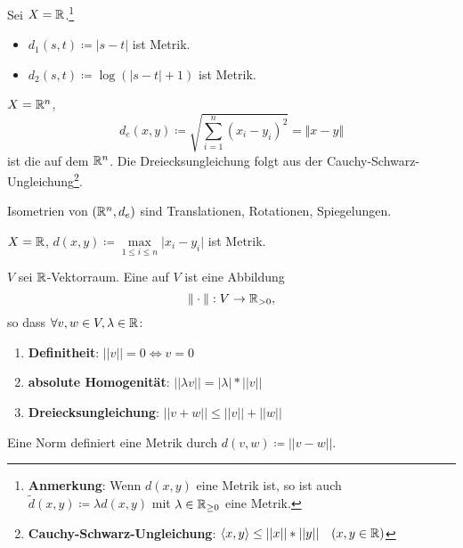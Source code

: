 \begin{example}\label{bsp:simpleMetriken}
  Sei \( X = \mathbb{R} \).\footnote{\textbf{Anmerkung}: Wenn \( d(x, y) \) eine Metrik ist, so ist auch \( \widetilde{d}(x, y) \coloneqq \lambda d(x, y) \) mit \( \lambda \in \mathbb{R}_{\geq 0} \) eine Metrik.}
  \begin{itemize}
    \item \( d_1(s, t) \coloneqq |s-t| \) ist Metrik.
    \item \( d_2(s, t) \coloneqq \log(|s-t|+1) \) ist Metrik.
  \end{itemize}
\end{example}

\begin{example}\label{bsp:standardmetrik}
  \( X = \mathbb{R}^n \),
  \begin{equation*}
    d_e(x, y) \coloneqq \sqrt{\sum_{i=1}^n{(x_i-y_i)}^2} = \Vert x-y \Vert
  \end{equation*}
  ist die  auf dem \( \mathbb{R}^n \). Die Dreiecksungleichung folgt aus der Cauchy-Schwarz-Ungleichung\footnote{\textbf{Cauchy-Schwarz-Ungleichung}: \( \langle x, y \rangle \leq ||x||*||y|| \quad (x, y \in \mathbb{R}) \)}.
\end{example}

\begin{remark}[aus LA II]
  Isometrien von \( (\mathbb{R}^n, d_e) \) sind Translationen, Rotationen, Spiegelungen.
\end{remark}

\begin{example}[Maximumsmetrik]\label{bsp:maximumsmetrik}
  \( X = \mathbb{R} \), \( d(x, y) \coloneqq \underset{1 \leq i \leq n}{\max} \vert x_i-y_i \vert \) ist Metrik.
\end{example}

\begin{example}\label{bsp:norm}
  \( V \) sei \( \mathbb{R} \)-Vektorraum. Eine  auf \( V \) ist eine Abbildung 
  \begin{equation*}
    \Vert\cdot\Vert : V \to \mathbb{R}_{>0}\text{,}
  \end{equation*}
  so dass \( \forall v, w \in V, \lambda \in \mathbb{R} \):
  \begin{enumerate}
    \item \textbf{Definitheit}: \( ||v|| = 0 \Leftrightarrow v = 0 \)
    \item \textbf{absolute Homogenität}: \( ||\lambda v|| = |\lambda| * ||v|| \)
    \item \textbf{Dreiecksungleichung}: \( ||v+w|| \leq ||v||+||w|| \)
  \end{enumerate}
  Eine Norm definiert eine Metrik durch \( d(v, w) \coloneqq ||v-w|| \).
\end{example}

